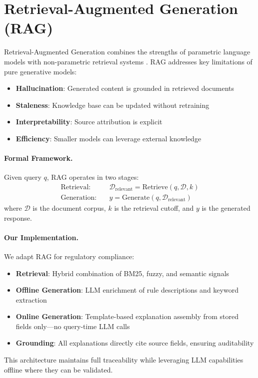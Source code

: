 \section{Retrieval-Augmented Generation (RAG)}
Retrieval-Augmented Generation combines the strengths of parametric language models with non-parametric retrieval systems \cite{rag-lewis2020, karpukhin2020dense}. RAG addresses key limitations of pure generative models:
\begin{itemize}[leftmargin=*,itemsep=2pt,topsep=2pt]
 \item \textbf{Hallucination}: Generated content is grounded in retrieved documents
 \item \textbf{Staleness}: Knowledge base can be updated without retraining
 \item \textbf{Interpretability}: Source attribution is explicit
 \item \textbf{Efficiency}: Smaller models can leverage external knowledge
\end{itemize}

\paragraph{Formal Framework.} Given query $q$, RAG operates in two stages:
\begin{align}
\text{Retrieval}: & \quad \mathcal{D}_{\text{relevant}} = \text{Retrieve}(q, \mathcal{D}, k) \\
\text{Generation}: & \quad y = \text{Generate}(q, \mathcal{D}_{\text{relevant}})
\end{align}
where $\mathcal{D}$ is the document corpus, $k$ is the retrieval cutoff, and $y$ is the generated response.

\paragraph{Our Implementation.} We adapt RAG for regulatory compliance:
\begin{itemize}[leftmargin=*,itemsep=2pt,topsep=2pt]
 \item \textbf{Retrieval}: Hybrid combination of BM25, fuzzy, and semantic signals
 \item \textbf{Offline Generation}: LLM enrichment of rule descriptions and keyword extraction
 \item \textbf{Online Generation}: Template-based explanation assembly from stored fields only—no query-time LLM calls
 \item \textbf{Grounding}: All explanations directly cite source fields, ensuring auditability
\end{itemize}
This architecture maintains full traceability while leveraging LLM capabilities offline where they can be validated.

